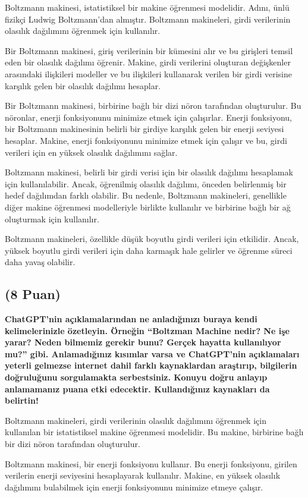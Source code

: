 \documentclass[11pt]{article}
\begin{document}
Boltzmann makinesi, istatistiksel bir makine öğrenmesi modelidir. Adını, ünlü fizikçi Ludwig Boltzmann'dan almıştır. Boltzmann makineleri, girdi verilerinin olasılık dağılımını öğrenmek için kullanılır.

Bir Boltzmann makinesi, giriş verilerinin bir kümesini alır ve bu girişleri temsil eden bir olasılık dağılımı öğrenir. Makine, girdi verilerini oluşturan değişkenler arasındaki ilişkileri modeller ve bu ilişkileri kullanarak verilen bir girdi verisine karşılık gelen bir olasılık dağılımı hesaplar.

Bir Boltzmann makinesi, birbirine bağlı bir dizi nöron tarafından oluşturulur. Bu nöronlar, enerji fonksiyonunu minimize etmek için çalışırlar. Enerji fonksiyonu, bir Boltzmann makinesinin belirli bir girdiye karşılık gelen bir enerji seviyesi hesaplar. Makine, enerji fonksiyonunu minimize etmek için çalışır ve bu, girdi verileri için en yüksek olasılık dağılımını sağlar.

Boltzmann makinesi, belirli bir girdi verisi için bir olasılık dağılımı hesaplamak için kullanılabilir. Ancak, öğrenilmiş olasılık dağılımı, önceden belirlenmiş bir hedef dağılımdan farklı olabilir. Bu nedenle, Boltzmann makineleri, genellikle diğer makine öğrenmesi modelleriyle birlikte kullanılır ve birbirine bağlı bir ağ oluşturmak için kullanılır.

Boltzmann makineleri, özellikle düşük boyutlu girdi verileri için etkilidir. Ancak, yüksek boyutlu girdi verileri için daha karmaşık hale gelirler ve öğrenme süreci daha yavaş olabilir.


\subsection{(8 Puan)} \textbf{ChatGPT’nin açıklamalarından ne anladığınızı buraya kendi kelimelerinizle özetleyin. Örneğin ``Boltzman Machine nedir? Ne işe yarar? Neden bilmemiz gerekir bunu? Gerçek hayatta kullanılıyor mu?'' gibi. Anlamadığınız kısımlar varsa ve ChatGPT’nin açıklamaları yeterli gelmezse internet dahil farklı kaynaklardan araştırıp, bilgilerin doğruluğunu sorgulamakta serbestsiniz. Konuyu doğru anlayıp anlamamanız puana etki edecektir. Kullandığınız kaynakları da belirtin!}

Boltzmann makineleri, girdi verilerinin olasılık dağılımını öğrenmek için kullanılan bir istatistiksel makine öğrenmesi modelidir. Bu makine, birbirine bağlı bir dizi nöron tarafından oluşturulur.

Boltzmann makinesi, bir enerji fonksiyonu kullanır. Bu enerji fonksiyonu, girilen verilerin enerji seviyesini hesaplayarak kullanılır. Makine, en yüksek olasılık dağılımını bulabilmek için enerji fonksiyonunu minimize etmeye çalışır.
\end{document}
